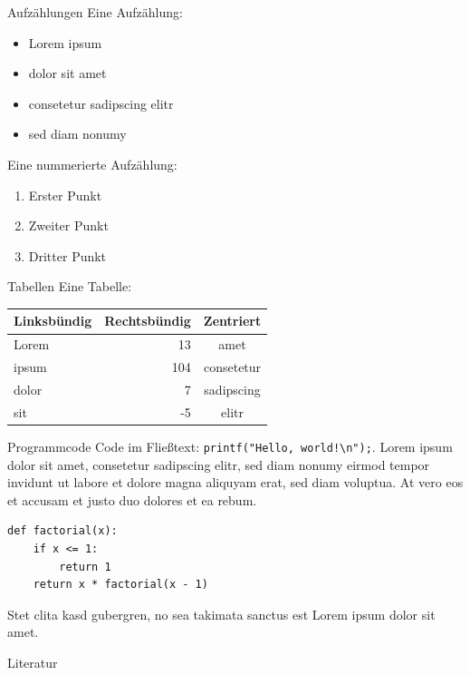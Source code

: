 \documentclass[a4paper, 10pt, twocolumn]{scrartcl}
\begin{document}
\begin{block}{Aufzählungen}
Eine Aufzählung:

\begin{itemize}
\item Lorem ipsum
\item dolor sit amet
\item consetetur sadipscing elitr
\item sed diam nonumy
\end{itemize}

Eine nummerierte Aufzählung:

\begin{enumerate}
\item Erster Punkt
\item Zweiter Punkt
\item Dritter Punkt
\end{enumerate}
\end{block}


\begin{block}{Tabellen}
Eine Tabelle:

\begin{center}
\begin{tabular}{lrc}
\toprule
Linksbündig & Rechtsbündig & Zentriert \\
\midrule
Lorem &  13 & amet \\
ipsum & 104 & consetetur \\
dolor &   7 & sadipscing \\
sit   &  -5 & elitr \\
\bottomrule
\end{tabular}
\label{beispieltabelle}
\end{center}
\end{block}


\begin{block}{Programmcode}
Code im Fließtext: \lstinline{printf("Hello, world!\n");}. Lorem ipsum dolor sit amet, consetetur sadipscing elitr, sed diam nonumy eirmod tempor invidunt ut labore et dolore magna aliquyam erat, sed diam voluptua. At vero eos et accusam et justo duo dolores et ea rebum.

\begin{lstlisting}
def factorial(x):
    if x <= 1:
        return 1
    return x * factorial(x - 1)
\end{lstlisting}

Stet clita kasd gubergren, no sea takimata sanctus est Lorem ipsum dolor sit amet.
\end{block}

\begin{block}{Literatur}
\printbibliography[heading=none]
\end{block}
\end{document}
